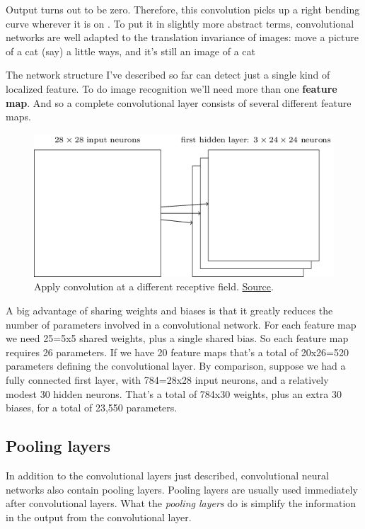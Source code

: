\documentclass[a4paper]{tufte-handout}
\begin{document}
Output turns out to be zero.
Therefore, this convolution picks up a right bending curve wherever it
is on . To put it in slightly more abstract terms, convolutional
networks are well adapted to the translation invariance of images: move
a picture of a cat (say) a little ways, and it's still an image of a cat

The network structure I've described so far can detect just a single
kind of localized feature. To do image recognition we'll need more than
one \textbf{feature map}. And so a complete convolutional layer consists
of several different feature maps.

\begin{figure}
\includegraphics[width=\linewidth]{conv4.png}
\caption{Apply convolution at a different receptive field.
\href{http://neuralnetworksanddeeplearning.com/chap6.html}{Source}.
}
\end{figure}

A big advantage of sharing weights and biases is that it greatly reduces
the number of parameters involved in a convolutional network. For each
feature map we need 25=5x5 shared weights, plus a single shared bias. So
each feature map requires 26 parameters. If we have 20 feature maps
that's a total of 20x26=520 parameters defining the convolutional layer.
By comparison, suppose we had a fully connected first layer, with
784=28x28 input neurons, and a relatively modest 30 hidden neurons.
That's a total of 784x30 weights, plus an extra 30 biases, for a total
of 23,550 parameters.


\subsection{Pooling layers}

In addition to the convolutional layers just described, convolutional
neural networks also contain pooling layers. Pooling layers are usually
used immediately after convolutional layers. What the \emph{pooling
layers} do is simplify the information in the output from the
convolutional layer.
\end{document}
